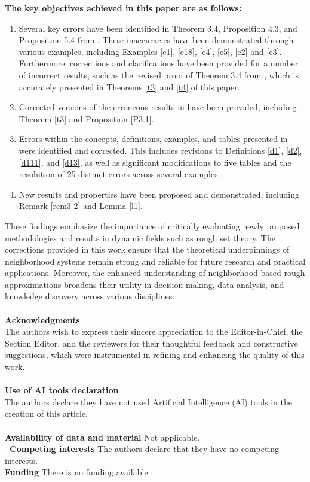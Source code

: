 \documentclass{article}
\theoremstyle{theorem}
\theoremstyle{definition}
\theoremstyle{remark}
\begin{document}
\textbf{The key objectives achieved in this paper are as follows:}
\begin{enumerate}
\item Several key errors have been identified in Theorem 3.4, Proposition 4.3, and Proposition 5.4 from \cite{Al-shami 2024}. These inaccuracies have been demonstrated through various examples, including Examples \ref{e1}, \ref{e18}, \ref{e4}, \ref{e5}, \ref{e2} and \ref{e3}. Furthermore, corrections and clarifications have been provided for a number of incorrect results, such as the revised proof of Theorem 3.4 from
    \cite{Al-shami 2024}, which is accurately presented in Theorems \ref{t3} and \ref{t4} of this paper.
\item Corrected versions of the erroneous results in \cite{Al-shami 2024} have been provided, including Theorem \ref{t3} and Proposition \ref{P3.1}.
\item Errors within the concepts, definitions, examples, and tables presented in \cite{Al-shami 2024} were identified and corrected. This includes revisions to Definitions \ref{d1}, \ref{d2}, \ref{d111}, and \ref{d13}, as well as significant modifications to five tables and the resolution of 25 distinct errors across several examples.
\item New results and properties have been proposed and demonstrated, including Remark \ref{rem3-2} and Lemma \ref{l1}.
\end{enumerate}

These findings emphasize the importance of critically evaluating newly proposed methodologies and results in dynamic fields such as rough set theory. The corrections provided in this work ensure that the theoretical underpinnings of neighborhood systems remain strong and reliable for future research and practical applications. Moreover, the enhanced understanding of neighborhood-based rough approximations broadens their utility in decision-making, data analysis, and knowledge discovery across various disciplines.\\
${}$\\
\textbf{Acknowledgments} \\
The authors wish to express their sincere appreciation to the Editor-in-Chief, the Section Editor, and the reviewers for their thoughtful feedback and constructive suggestions, which were instrumental in refining and enhancing the quality of this work. \\
${}$\\
\textbf{Use of AI tools declaration} \\
The authors declare they have not used Artificial Intelligence (AI) tools in the creation of this article. \\
${}$\\
\textbf{Availability of data and material} Not applicable.\newline
${}$\\
\textbf{\ Competing interests} The authors declare that they have no competing interests.\newline
${}$\\
\textbf{Funding} There is no funding available.\\
${}$\\
\end{document}
